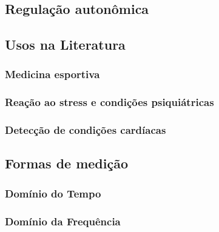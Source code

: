         \subsection {Regulação autonômica}
        
      
        \subsection {Usos na Literatura}
        
            \subsubsection{Medicina esportiva}
            
            \subsubsection{Reação ao stress e condições psiquiátricas}
            
            \subsubsection{Detecção de condições cardíacas}
        
        \subsection {Formas de medição}
        
            \subsubsection{Domínio do Tempo}
            
            \subsubsection{Domínio da Frequência}




